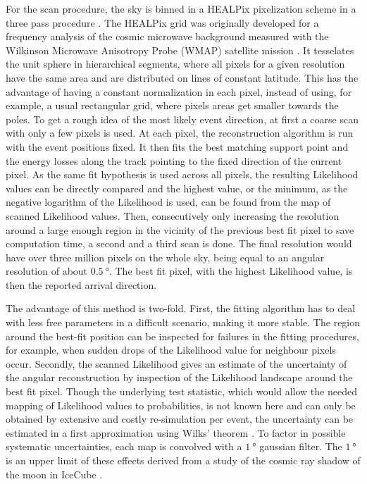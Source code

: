 For the scan procedure, the sky is binned in a HEALPix pixelization scheme in a three pass procedure \cite{Gorski:2004by}.
The HEALPix grid was originally developed for a frequency analysis of the cosmic microwave background measured with the Wilkinson Microwave Anisotropy Probe (WMAP) satellite mission \cite{Jarosik:2010iu}.
It tesselates the unit sphere in hierarchical segments, where all pixels for a given resolution have the same area and are distributed on lines of constant latitude.
This has the advantage of having a constant normalization in each pixel, instead of using, for example, a usual rectangular grid, where pixels areas get smaller towards the poles.
To get a rough idea of the most likely event direction, at first a coarse scan with only a few pixels is used.
At each pixel, the reconstruction algorithm is run with the event positions fixed.
It then fits the best matching support point and the energy losses along the track pointing to the fixed direction of the current pixel.
As the same fit hypothesis is used across all pixels, the resulting Likelihood values can be directly compared and the highest value, or the minimum, as the negative logarithm of the Likelihood is used, can be found from the map of scanned Likelihood values.
Then, consecutively only increasing the resolution around a large enough region in the vicinity of the previous best fit pixel to save computation time, a second and a third scan is done.
The final resolution would have over three million pixels on the whole sky, being equal to an angular resolution of about $\SI{0.5}{\degree}$.
The best fit pixel, with the highest Likelihood value, is then the reported arrival direction.

The advantage of this method is two-fold.
First, the fitting algorithm has to deal with less free parameters in a difficult scenario, making it more stable.
The region around the best-fit position can be inspected for failures in the fitting procedures, for example, when sudden drops of the Likelihood value for neighbour pixels occur.
Secondly, the scanned Likelihood gives an estimate of the uncertainty of the angular reconstruction by inspection of the Likelihood landscape around the best fit pixel.
Though the underlying test statistic, which would allow the needed mapping of Likelihood values to probabilities, is not known here and can only be obtained by extensive and costly re-simulation per event, the uncertainty can be estimated in a first approximation using Wilks' theorem \cite{Wilks:1938dza,casella2002statistical,bohm2010introduction}.
To factor in possible systematic uncertainties, each map is convolved with a $\SI{1}{\degree}$ gaussian filter.
The $\SI{1}{\degree}$ is an upper limit of these effects derived from a study of the cosmic ray shadow of the moon in IceCube \cite{Aartsen:2013jdh,Aartsen:2013zka}.

